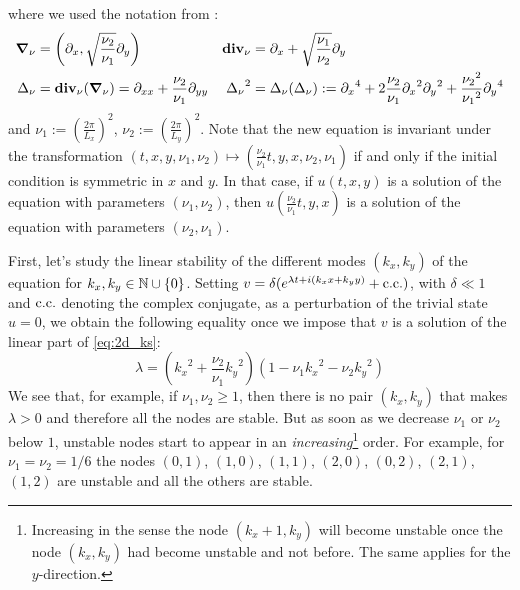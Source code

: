 \documentclass[twoside]{article}
\begin{document}
where we used the notation from \cite{Kalogirou2015}:
\begin{align}
  \grad_\nu & = \left(\partial_x , \sqrt{\frac{\nu_2}{\nu_1}} \partial_y
  \right)   & \operatorname{\boldsymbol{\mathrm{div}}}_\nu                                                   & = \partial_x + \sqrt{\frac{\nu_1}{\nu_2}} \partial_y
  \\ \Delta_\nu &= \operatorname{\boldsymbol{\mathrm{div}}}_\nu(\grad_\nu) = \partial_{xx} + \frac{\nu_2}{\nu_1} \partial_{yy} & {\Delta_\nu}^2 &= \Delta_\nu(\Delta_\nu) := {\partial_{x}}^4 + 2 \frac{\nu_2}{\nu_1} {\partial_{x}}^2{\partial_{y}}^2 + \frac{{\nu_2}^2}{{\nu_1}^2} {\partial_{y}}^4
\end{align}
and $\nu_1 :={\left( \frac{2\pi}{L_x} \right)}^2$, $\nu_2 := {\left( \frac{2\pi}{L_y} \right)}^2$. Note that the new equation is invariant under the transformation $(t,x,y, \nu_1, \nu_2) \mapsto \left( \frac{\nu_2}{\nu_1} t, y, x, \nu_2, \nu_1 \right)$ if and only if the initial condition is symmetric in $x$ and $y$. In that case, if $u(t,x,y)$ is a solution of the equation with parameters $(\nu_1, \nu_2)$, then $u\left( \frac{\nu_2}{\nu_1} t, y, x \right)$ is a solution of the equation with parameters $(\nu_2, \nu_1)$.

First, let's study the linear stability of the different modes $(k_x, k_y)$ of the equation for $k_x,k_y\in\mathbb{N}\cup\{0\}$. Setting $v = \delta(e^{\lambda t+i(k_x x + k_y y)} + \mathrm{c.c.})$, with $\delta \ll 1$ and $\mathrm{c.c.}$ denoting the complex conjugate, as a perturbation of the trivial state $u = 0$, we obtain the following equality once we impose that $v$ is a solution of the linear part of \cref{eq:2d_ks}:
\begin{equation}\label{eq:linear_stability}
  \lambda = \left({k_x}^2+ \frac{\nu_2}{\nu_1} {k_y}^2\right)\left( 1 - \nu_1{k_x}^2 - \nu_2{k_y}^2\right)
\end{equation}
We see that, for example, if $\nu_1, \nu_2 \geq 1$, then there is no pair $(k_x, k_y)$ that makes $\lambda > 0$ and therefore all the nodes are stable. But as soon as we decrease $\nu_1$ or $\nu_2$ below $1$, unstable nodes start to appear in an \emph{increasing}\footnote{Increasing in the sense the node $(k_x+1,k_y)$ will become unstable once the node $(k_x,k_y)$ had become unstable and not before. The same applies for the $y$-direction.} order. For example, for $\nu_1=\nu_2=1/6$ the nodes $(0,1)$, $(1,0)$, $(1,1)$, $(2,0)$, $(0,2)$, $(2,1)$, $(1,2)$ are unstable and all the others are stable.
\end{document}
